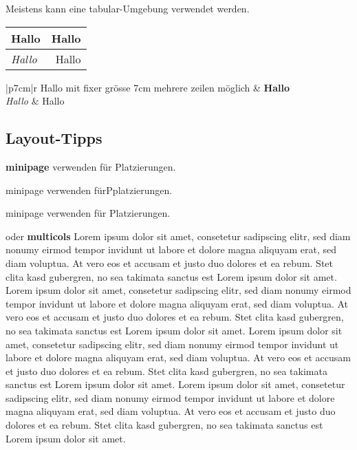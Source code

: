 Meistens kann eine tabular-Umgebung verwendet werden. \newline
\begin{tabular}{l|r}
    Hallo & \textbf{Hallo}\\ \hline
    \textit{Hallo} & Hallo \\
\end{tabular} \qquad
\begin{tabular}{|p{7cm}|r}
    Hallo mit fixer grösse 7cm\newline
    mehrere zeilen möglich & \textbf{Hallo}\\ \hline
    \textit{Hallo} & Hallo \\
\end{tabular}

\subsection{Layout-Tipps}
\begin{minipage}{0.5\linewidth}
    \textbf{minipage} verwenden für Platzierungen.
\end{minipage}
\begin{minipage}{0.2\linewidth}
    minipage verwenden fürPplatzierungen.
\end{minipage}
\begin{minipage}{0.3\linewidth}
    minipage verwenden für Platzierungen.
\end{minipage}
\vspace{1cm}
\begin{multicols}{2}
    oder \textbf{multicols}\newline
    Lorem ipsum dolor sit amet, consetetur sadipscing elitr, sed diam nonumy eirmod tempor invidunt ut labore et dolore magna aliquyam erat, sed diam voluptua. At vero eos et accusam et justo duo dolores et ea rebum. Stet clita kasd gubergren, no sea takimata sanctus est Lorem ipsum dolor sit amet. Lorem ipsum dolor sit amet, consetetur sadipscing elitr, sed diam nonumy eirmod tempor invidunt ut labore et dolore magna aliquyam erat, sed diam voluptua. At vero eos et accusam et justo duo dolores et ea rebum. Stet clita kasd gubergren, no sea takimata sanctus est Lorem ipsum dolor sit amet.
    \columnbreak
    Lorem ipsum dolor sit amet, consetetur sadipscing elitr, sed diam nonumy eirmod tempor invidunt ut labore et dolore magna aliquyam erat, sed diam voluptua. At vero eos et accusam et justo duo dolores et ea rebum. Stet clita kasd gubergren, no sea takimata sanctus est Lorem ipsum dolor sit amet. Lorem ipsum dolor sit amet, consetetur sadipscing elitr, sed diam nonumy eirmod tempor invidunt ut labore et dolore magna aliquyam erat, sed diam voluptua. At vero eos et accusam et justo duo dolores et ea rebum. Stet clita kasd gubergren, no sea takimata sanctus est Lorem ipsum dolor sit amet.
\end{multicols}

